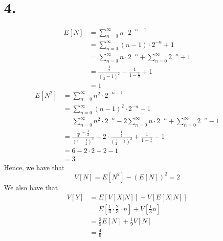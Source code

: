 \documentclass[11pt]{article}
\begin{document}
\section*{4.}
\begin{equation*}
    \begin{aligned}
        E[N] &= \sum_{n=0}^\infty n \cdot 2 ^{-n-1} \\
        &= \sum_{n=0}^\infty (n-1) \cdot 2^{-n}  + 1  \\
        &= \sum_{n=0}^\infty n \cdot 2^{-n} + \sum_{n=0}^\infty 2^{-n} + 1 \\
        &= \frac{\frac{1}{2}}{\left(\frac{1}{2}-1\right)^2} - \frac{1}{1-\frac{1}{2}} + 1 \\
        &= 1
    \end{aligned}
\end{equation*}
\begin{equation*}
    \begin{aligned}
        E[N^2] &= \sum_{n=0}^\infty n^2 \cdot 2 ^{-n-1} \\
        &= \sum_{n=0}^\infty (n-1)^2 \cdot 2^{-n}  - 1  \\
        &= \sum_{n=0}^\infty n^2 \cdot 2^{-n} - 2 \sum_{n=0}^\infty n \cdot 2^{-n} + \sum_{n=0}^\infty 2^{-n} - 1 \\
        &= \frac{\frac{1}{2^2} + \frac{1}{2}}{\left(1-\frac{1}{2}\right)^3} - 2\cdot \frac{\frac{1}{2}}{\left(\frac{1}{2}-1\right)^2} + \frac{1}{1-\frac{1}{2}} - 1 \\
        &= 6 - 2\cdot 2 + 2 - 1 \\
        &= 3
    \end{aligned}
\end{equation*}
Hence, we have that 
\[
    V[N] = E[N^2] - (E[N])^2 = 2     
\]
We also have that 
\begin{equation*}
    \begin{aligned}
        V[Y] &= E[V[X|N]] + V[E[X|N]] \\
        &= E\left[\frac{1}{3} \cdot \frac{2}{3}\cdot n \right] + V\left[\frac{1}{3}n\right] \\
        &= \frac{2}{9} E[N] + \frac{1}{9} V[N] \\
        &= \frac{4}{9}
    \end{aligned}
\end{equation*}
\end{document}
